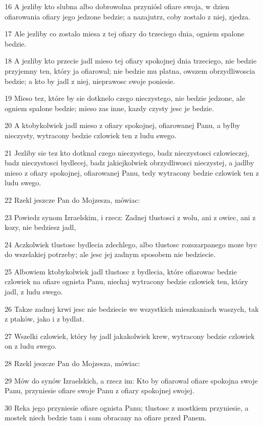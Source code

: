 \par 16 A jezliby kto slubna albo dobrowolna przyniósl ofiare swoja, w dzien ofiarowania ofiary jego jedzone bedzie; a nazajutrz, coby zostalo z niej, zjedza.
\par 17 Ale jezliby co zostalo miesa z tej ofiary do trzeciego dnia, ogniem spalone bedzie.
\par 18 A jezliby kto przecie jadl mieso tej ofiary spokojnej dnia trzeciego, nie bedzie przyjemny ten, który ja ofiarowal; nie bedzie mu platna, owszem obrzydliwoscia bedzie; a kto by jadl z niej, nieprawosc swoje poniesie.
\par 19 Mieso tez, które by sie dotknelo czego nieczystego, nie bedzie jedzone, ale ogniem spalone bedzie; mieso zas inne, kazdy czysty jesc je bedzie.
\par 20 A ktobykolwiek jadl mieso z ofiary spokojnej, ofiarowanej Panu, a bylby nieczysty, wytracony bedzie czlowiek ten z ludu swego.
\par 21 Jezliby sie tez kto dotknal czego nieczystego, badz nieczystosci czlowieczej, badz nieczystosci bydlecej, badz jakiejkolwiek obrzydliwosci nieczystej, a jadlby mieso z ofiary spokojnej, ofiarowanej Panu, tedy wytracony bedzie czlowiek ten z ludu swego.
\par 22 Rzekl jeszcze Pan do Mojzesza, mówiac:
\par 23 Powiedz synom Izraelskim, i rzecz: Zadnej tlustosci z wolu, ani z owiec, ani z kozy, nie bedziesz jadl,
\par 24 Aczkolwiek tlustosc bydlecia zdechlego, albo tlustosc rozszarpanego moze byc do wszelakiej potrzeby; ale jesc jej zadnym sposobem nie bedziecie.
\par 25 Albowiem ktobykolwiek jadl tlustosc z bydlecia, które ofiarowac bedzie czlowiek na ofiare ognista Panu, niechaj wytracony bedzie czlowiek ten, który jadl, z ludu swego.
\par 26 Takze zadnej krwi jesc nie bedziecie we wszystkich mieszkaniach waszych, tak z ptaków, jako i z bydlat.
\par 27 Wszelki czlowiek, który by jadl jakakolwiek krew, wytracony bedzie czlowiek on z ludu swego.
\par 28 Rzekl jeszcze Pan do Mojzesza, mówiac:
\par 29 Mów do synów Izraelskich, a rzecz im: Kto by ofiarowal ofiare spokojna swoje Panu, przyniesie ofiare swoje Panu z ofiary spokojnej swojej.
\par 30 Reka jego przyniesie ofiare ognista Panu; tlustosc z mostkiem przyniesie, a mostek niech bedzie tam i sam obracany na ofiare przed Panem.
